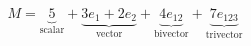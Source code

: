 \documentclass[preview]{standalone}
\begin{document}
\begin{align*}
M = \underbrace{5}_{\text{scalar}} + \underbrace{3e_1 + 2e_2}_{\text{vector}} + \underbrace{4e_{12}}_{\text{bivector}} + \underbrace{7e_{123}}_{\text{trivector}}
\end{align*}
\end{document}
